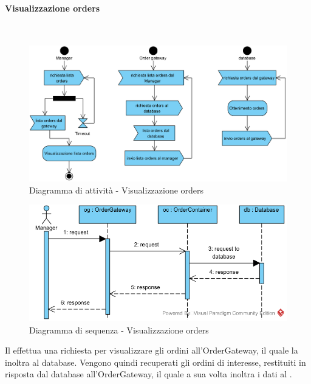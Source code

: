 \begin{samepage}
\paragraph{Visualizzazione orders}\mbox{}\\
\begin{figure}[H]
	\centering
	\includegraphics[width=14cm]{diagrammi_img/attivita/manager_ordini.png}
	\caption{Diagramma di attività - Visualizzazione orders}
\end{figure}
\end{samepage}
\begin{figure}[H]
	\centering
	\includegraphics[width=14cm]{../../documenti/SpecificaTecnica/diagrammi_img/sequenza/direttore_visualizza_orders.png}
	\caption{Diagramma di sequenza - Visualizzazione orders}
\end{figure}
Il \Manager{} effettua una richiesta per visualizzare gli ordini all'Order\-Gateway, il quale la inoltra al database. Vengono quindi recuperati gli ordini di interesse, restituiti in risposta dal database all'Order\-Gateway, il quale a sua volta inoltra i dati al \Manager{}.

